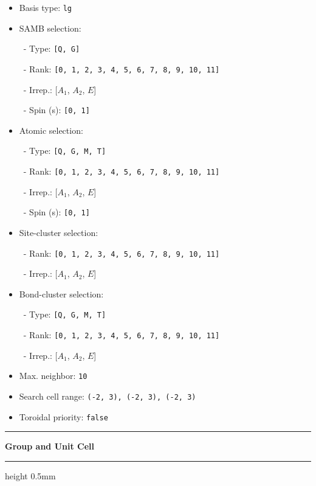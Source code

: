 \documentclass[fleqn,10pt,landscape]{jsarticle}
\begin{document}
\begin{itemize}
\item Basis type: \texttt{lg}

\item SAMB selection:

\, - Type: \texttt{[Q, G]}

\, - Rank: \texttt{[0, 1, 2, 3, 4, 5, 6, 7, 8, 9, 10, 11]}

\, - Irrep.: [$A_{1}$, $A_{2}$, $E$]

\, - Spin (s): \texttt{[0, 1]}

\item Atomic selection:

\, - Type: \texttt{[Q, G, M, T]}

\, - Rank: \texttt{[0, 1, 2, 3, 4, 5, 6, 7, 8, 9, 10, 11]}

\, - Irrep.: [$A_{1}$, $A_{2}$, $E$]

\, - Spin (s): \texttt{[0, 1]}

\item Site-cluster selection:

\, - Rank: \texttt{[0, 1, 2, 3, 4, 5, 6, 7, 8, 9, 10, 11]}

\, - Irrep.: [$A_{1}$, $A_{2}$, $E$]

\item Bond-cluster selection:

\, - Type: \texttt{[Q, G, M, T]}

\, - Rank: \texttt{[0, 1, 2, 3, 4, 5, 6, 7, 8, 9, 10, 11]}

\, - Irrep.: [$A_{1}$, $A_{2}$, $E$]

\item Max. neighbor: \texttt{10}

\item Search cell range: \texttt{(-2, 3), (-2, 3), (-2, 3)}

\item Toroidal priority: \texttt{false}

\end{itemize}
\vspace{5mm}
\noindent \rule[0.5mm]{5mm}{0.5mm}\hspace{3mm}\textbf{Group and Unit Cell}\hspace{3mm}\leaders\hrule height 0.5mm\hfill\kern0pt
\vspace{3mm}
\end{document}
